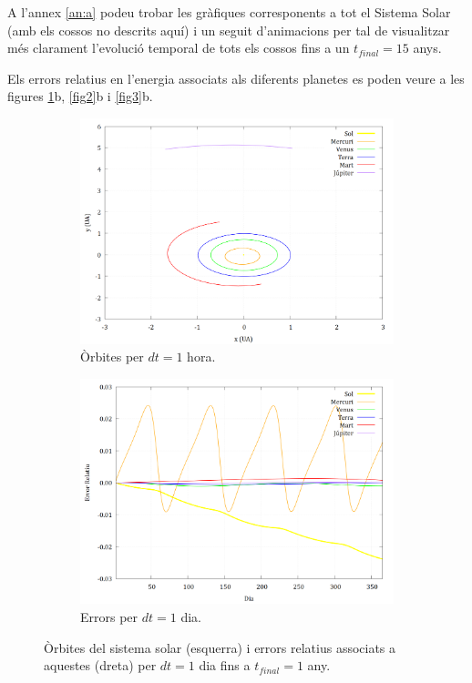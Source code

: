 \documentclass[10pt, twoside, a4paper]{article}
\begin{document}
A l'annex \ref{an:a} podeu trobar les gràfiques corresponents a tot el Sistema Solar (amb els cossos no descrits aquí) i un seguit d'animacions per tal de visualitzar més clarament l'evolució temporal de tots els cossos fins a un $t_{final}=15$ anys.

Els errors relatius en l'energia associats als diferents planetes es poden veure a les figures \ref{fig1}b, \ref{fig2}b i \ref{fig3}b.

\begin{figure}[h]
    \centering
    
    \begin{subfigure}[b]{0.495\linewidth}
        \centering
        \includegraphics[width=\linewidth]{../sist_solar/orbites_euler_1_d1dia.png}
        \caption{Òrbites per $dt=1$ hora.}
    \end{subfigure}
    \hfill
    \begin{subfigure}[b]{0.495\linewidth}
        \centering
        \includegraphics[width=\linewidth]{../Error/error_1_dia.png}
        \caption{Errors per $dt=1$ dia.}
    \end{subfigure}
    \caption{Òrbites del sistema solar (esquerra) i errors relatius associats a aquestes (dreta) per $dt=1$ dia fins a $t_{final}=1$ any.}
    \label{fig1}
\end{figure}
\end{document}
